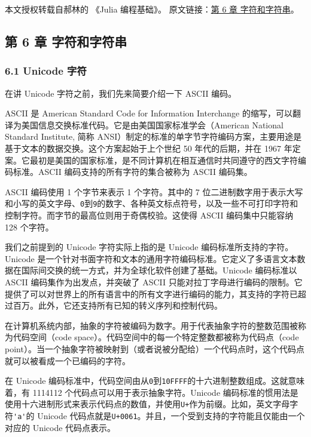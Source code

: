 
本文授权转载自郝林的 《Julia 编程基础》。 原文链接：\href{https://github.com/hyper0x/JuliaBasics/blob/master/book/ch06.md}{第 6 章 字符和字符串}。


\subsection{第 6 章 字符和字符串}

\subsubsection{6.1 Unicode 字符}

在讲 Unicode 字符之前，我们先来简要介绍一下 ASCII 编码。

ASCII 是 American Standard Code for Information Interchange 的缩写，可以翻译为美国信息交换标准代码。它是由美国国家标准学会（American National Standard Institute, 简称 ANSI）制定的标准的单字节字符编码方案，主要用途是基于文本的数据交换。这个方案起始于上个世纪 50 年代的后期，并在 1967 年定案。它最初是美国的国家标准，是不同计算机在相互通信时共同遵守的西文字符编码标准。ASCII 编码支持的所有字符的集合被称为 ASCII 编码集。

ASCII 编码使用 1 个字节来表示 1 个字符。其中的 7 位二进制数字用于表示大写和小写的英文字母、\verb`0`到\verb`9`的数字、各种英文标点符号，以及一些不可打印字符和控制字符。而字节的最高位则用于奇偶校验。这使得 ASCII 编码集中只能容纳 128 个字符。

我们之前提到的 Unicode 字符实际上指的是 Unicode 编码标准所支持的字符。Unicode 是一个针对书面字符和文本的通用字符编码标准。它定义了多语言文本数据在国际间交换的统一方式，并为全球化软件创建了基础。Unicode 编码标准以 ASCII 编码集作为出发点，并突破了 ASCII 只能对拉丁字母进行编码的限制。它提供了可以对世界上的所有语言中的所有文字进行编码的能力，其支持的字符已超过百万。此外，它还支持所有已知的转义序列和控制代码。

在计算机系统内部，抽象的字符被编码为数字。用于代表抽象字符的整数范围被称为代码空间（code space）。代码空间中的每一个特定整数都被称为代码点（code point）。当一个抽象字符被映射到（或者说被分配给）一个代码点时，这个代码点就可以被看成一个已编码的字符。

在 Unicode 编码标准中，代码空间由从\verb`0`到\verb`10FFFF`的十六进制整数组成。这就意味着，有 1114112 个代码点可以用于表示抽象字符。Unicode 编码标准的惯用法是使用十六进制形式来表示代码点的数值，并使用\verb`U+`作为前缀。比如，英文字母字符\verb`'a'`的 Unicode 代码点就是\verb`U+0061`。并且，一个受到支持的字符能且仅能由一个对应的 Unicode 代码点表示。

